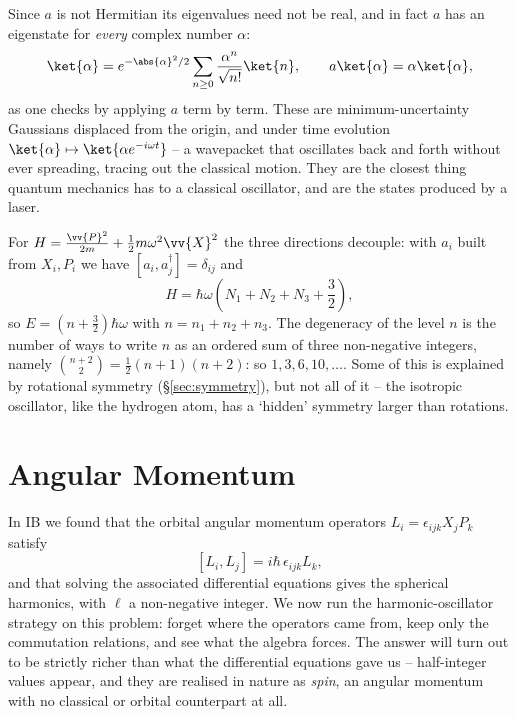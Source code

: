 \begin{remark}
    Since $a$ is not Hermitian its eigenvalues need not be real, and in fact $a$ has an eigenstate for \emph{every} complex number $\alpha$:
    $$
    \ket{\alpha} = e^{-\abs{\alpha}^2/2}\sum_{n \geq 0}\frac{\alpha^n}{\sqrt{n!}}\ket{n}, \qquad a \ket{\alpha} = \alpha \ket{\alpha},
    $$
    as one checks by applying $a$ term by term. These  are minimum-uncertainty Gaussians displaced from the origin, and under time evolution $\ket{\alpha} \mapsto \ket{\alpha e^{-i\omega t}}$ -- a wavepacket that oscillates back and forth without ever spreading, tracing out the classical motion. They are the closest thing quantum mechanics has to a classical oscillator, and are the states produced by a laser.
\end{remark}

\begin{example}
    For $H = \frac{\vv{P}^2}{2m} + \frac12 m\omega^2 \vv{X}^2$ the three directions decouple: with $a_i$ built from $X_i, P_i$ we have $[a_i, a_j^\dagger] = \delta_{ij}$ and
    $$
    H = \hbar\omega\left( N_1 + N_2 + N_3 + \frac{3}{2} \right),
    $$
    so $E = (n + \frac32)\hbar\omega$ with $n = n_1+n_2+n_3$. The degeneracy of the level $n$ is the number of ways to write $n$ as an ordered sum of three non-negative integers, namely $\binom{n+2}{2} = \frac12(n+1)(n+2)$: so $1, 3, 6, 10, \dots$. Some of this is explained by rotational symmetry (\S\ref{sec:symmetry}), but not all of it -- the isotropic oscillator, like the hydrogen atom, has a `hidden' symmetry larger than rotations.
\end{example}

\section{Angular Momentum}\label{sec:angmom}

In IB we found that the orbital angular momentum operators $L_i = \epsilon_{ijk}X_jP_k$ satisfy
$$
[L_i, L_j] = i\hbar\,\epsilon_{ijk}L_k,
$$
and that solving the associated differential equations gives the spherical harmonics, with $\ell$ a non-negative integer. We now run the harmonic-oscillator strategy on this problem: forget where the operators came from, keep only the commutation relations, and see what the algebra forces. The answer will turn out to be strictly richer than what the differential equations gave us -- half-integer values appear, and they are realised in nature as \emph{spin}, an angular momentum with no classical or orbital counterpart at all.

